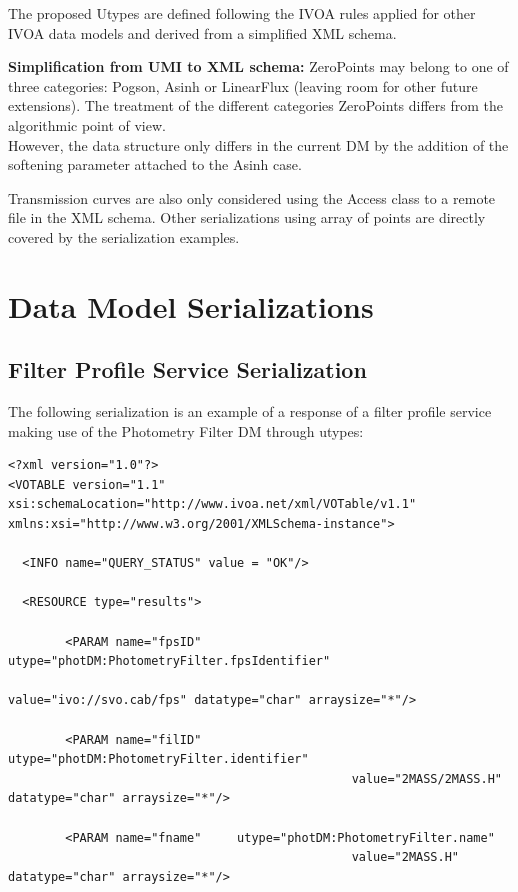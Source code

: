 \documentclass[11pt,a4paper]{ivoa}
\begin{document}
\begin{appendices}
The proposed Utypes are defined following the IVOA rules applied for other IVOA data models and derived from a simplified XML schema.
\par

\textbf{Simplification from UMI to XML schema:}
ZeroPoints may belong to one of three categories: Pogson, Asinh or LinearFlux (leaving room for other future extensions). The treatment of the different categories ZeroPoints differs from the algorithmic point of view. \\
However, the data structure only differs in the current DM by the addition of the softening parameter attached to the Asinh case.
\par

Transmission curves are also only considered using the Access class to a remote file in the XML schema. Other serializations using array of points are directly covered by the serialization examples.
\par

\section{Data Model Serializations} \label{serialization}
\subsection{Filter Profile Service Serialization} \label{serializationfilter}

The following serialization is an example of a response of a filter profile service making use of the Photometry Filter DM through utypes:
\par

\begin{verbatim}
<?xml version="1.0"?>
<VOTABLE version="1.1" xsi:schemaLocation="http://www.ivoa.net/xml/VOTable/v1.1"
xmlns:xsi="http://www.w3.org/2001/XMLSchema-instance">

  <INFO name="QUERY_STATUS" value = "OK"/>

  <RESOURCE type="results">

        <PARAM name="fpsID" 	utype="photDM:PhotometryFilter.fpsIdentifier"
        										value="ivo://svo.cab/fps" datatype="char" arraysize="*"/>

        <PARAM name="filID" 	utype="photDM:PhotometryFilter.identifier"
        										value="2MASS/2MASS.H" datatype="char" arraysize="*"/>

        <PARAM name="fname" 	utype="photDM:PhotometryFilter.name"
        										value="2MASS.H" datatype="char" arraysize="*"/>


\end{verbatim}
\end{appendices}
\end{document}
